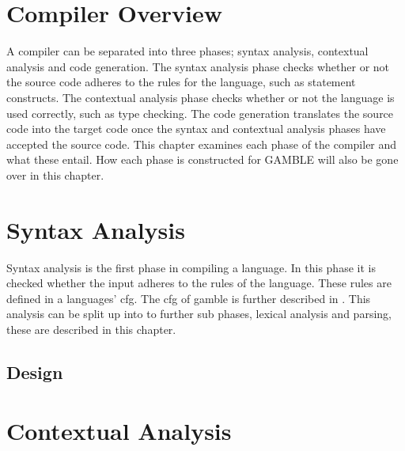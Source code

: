 \chapter{Compiler Overview}
A compiler can be separated into three phases; syntax analysis, contextual analysis and code generation.
The syntax analysis phase checks whether or not the source code adheres to the rules for the language, such as statement constructs.
The contextual analysis phase checks whether or not the language is used correctly, such as type checking.
The code generation translates the source code into the target code once the syntax and contextual analysis phases have accepted the source code.
This chapter examines each phase of the compiler and what these entail.
How each phase is constructed for GAMBLE will also be gone over in this chapter. %





\chapter{Syntax Analysis}
Syntax analysis is the first phase in compiling a language.
In this phase it is checked whether the input adheres to the rules of the language.
These rules are defined in a languages' \acrshort{cfg}.
The \acrshort{cfg} of \gls{gamble} is further described in  .
This analysis can be split up into to further sub phases, lexical analysis and parsing, these are described in this chapter.
\section{Design}









\chapter{Contextual Analysis}



